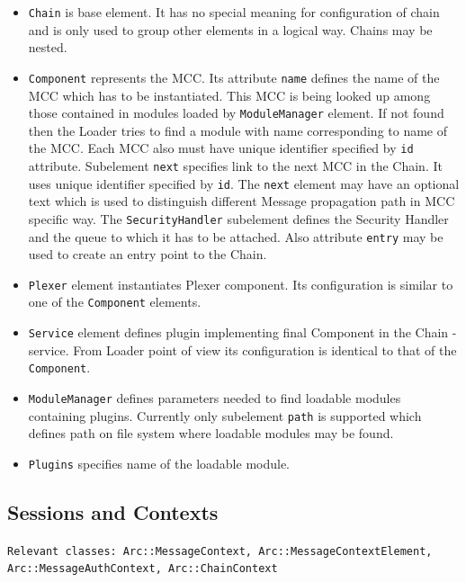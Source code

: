 \documentclass{book}
\begin{document}
\begin{itemize}

\item \texttt{Chain} is base element. It has no special meaning for configuration of chain and is only used to group other elements in a logical way. Chains may be nested.

\item \texttt{Component} represents the MCC. Its attribute \texttt{name} defines the name of the MCC which has to be instantiated. This MCC is being looked up among those contained in modules loaded by \texttt{ModuleManager} element. If not found then the Loader tries to find a module with name corresponding to name of the MCC. Each MCC also must have unique identifier specified by \texttt{id} attribute. Subelement \texttt{next} specifies link to the next MCC in the Chain. It uses unique identifier specified by \texttt{id}. The \texttt{next} element may have an optional text which is used to distinguish different Message propagation path in MCC specific way. The \texttt{SecurityHandler} subelement defines the Security Handler and the queue to which it has to be attached. Also attribute \texttt{entry} may be used to create an entry point to the Chain.

\item \texttt{Plexer} element instantiates Plexer component. Its configuration is similar to one of the \texttt{Component} elements.

\item \texttt{Service} element defines plugin implementing final Component in the Chain - service. From Loader point of view its configuration is identical to that of the \texttt{Component}.

\item \texttt{ModuleManager} defines parameters needed to find loadable modules containing plugins. Currently only subelement \texttt{path} is supported which defines path on file system where loadable modules may be found.

\item \texttt{Plugins} specifies name of the loadable module.

\end{itemize}

\subsection{Sessions and Contexts}

\texttt{Relevant classes: Arc::MessageContext, Arc::MessageContextElement, Arc::MessageAuthContext, Arc::ChainContext }
\end{document}
